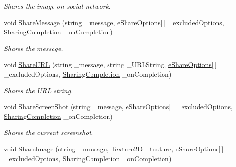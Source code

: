 \begin{DoxyCompactItemize}
\begin{DoxyCompactList}\small\item\em Shares the image on social network. \end{DoxyCompactList}\item 
void \hyperlink{class_voxel_busters_1_1_native_plugins_1_1_sharing_a27fc65c3d7fd64eb632c4e942e0a24a3}{Share\+Message} (string \+\_\+message, \hyperlink{namespace_voxel_busters_1_1_native_plugins_a96ecd12080e18bce52fed6a15bee7367}{e\+Share\+Options}\mbox{[}$\,$\mbox{]} \+\_\+excluded\+Options, \hyperlink{class_voxel_busters_1_1_native_plugins_1_1_sharing_a61017c6d51721d2ca6154ffef15a6555}{Sharing\+Completion} \+\_\+on\+Completion)
\begin{DoxyCompactList}\small\item\em Shares the message. \end{DoxyCompactList}\item 
void \hyperlink{class_voxel_busters_1_1_native_plugins_1_1_sharing_adcc0d02bd75da42ca155860dfac6911e}{Share\+U\+R\+L} (string \+\_\+message, string \+\_\+\+U\+R\+L\+String, \hyperlink{namespace_voxel_busters_1_1_native_plugins_a96ecd12080e18bce52fed6a15bee7367}{e\+Share\+Options}\mbox{[}$\,$\mbox{]} \+\_\+excluded\+Options, \hyperlink{class_voxel_busters_1_1_native_plugins_1_1_sharing_a61017c6d51721d2ca6154ffef15a6555}{Sharing\+Completion} \+\_\+on\+Completion)
\begin{DoxyCompactList}\small\item\em Shares the U\+R\+L string. \end{DoxyCompactList}\item 
void \hyperlink{class_voxel_busters_1_1_native_plugins_1_1_sharing_afdfce5bec0137c0070523edeef924140}{Share\+Screen\+Shot} (string \+\_\+message, \hyperlink{namespace_voxel_busters_1_1_native_plugins_a96ecd12080e18bce52fed6a15bee7367}{e\+Share\+Options}\mbox{[}$\,$\mbox{]} \+\_\+excluded\+Options, \hyperlink{class_voxel_busters_1_1_native_plugins_1_1_sharing_a61017c6d51721d2ca6154ffef15a6555}{Sharing\+Completion} \+\_\+on\+Completion)
\begin{DoxyCompactList}\small\item\em Shares the current screenshot. \end{DoxyCompactList}\item 
void \hyperlink{class_voxel_busters_1_1_native_plugins_1_1_sharing_ac734668e539da5d0a45c45b7997e5a31}{Share\+Image} (string \+\_\+message, Texture2\+D \+\_\+texture, \hyperlink{namespace_voxel_busters_1_1_native_plugins_a96ecd12080e18bce52fed6a15bee7367}{e\+Share\+Options}\mbox{[}$\,$\mbox{]} \+\_\+excluded\+Options, \hyperlink{class_voxel_busters_1_1_native_plugins_1_1_sharing_a61017c6d51721d2ca6154ffef15a6555}{Sharing\+Completion} \+\_\+on\+Completion)

\end{DoxyCompactItemize}
